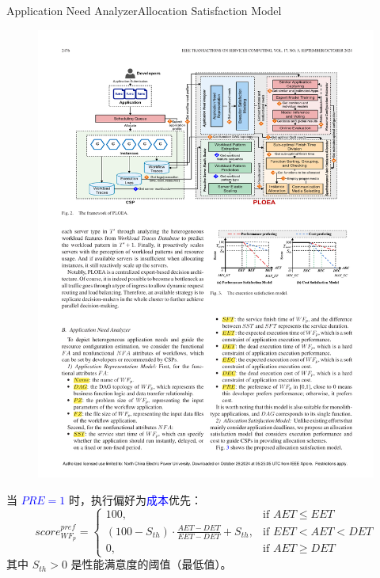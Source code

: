 \documentclass[aspectratio=169]{beamer}
\begin{document}
\begin{frame}{Application Need Analyzer}{Allocation Satisfaction Model}
  \begin{figure}
    \centering
    \includegraphics[height=0.4\textheight]{img/method/satisfaction-model.pdf}
  \end{figure}
  当 \textcolor{blue}{$PRE=1$} 时，执行偏好为\textcolor{blue}{成本}优先：
  \begin{equation*}
    score_{WF_p}^{pref} =
    \begin{cases}
      100, & \text{if } AET \leqslant EET \\
      (100-S_{th}) \cdot \frac{AET - DET}{EET - DET} + S_{th}, & \text{if } EET < AET < DET \\
      0, & \text{if } AET \geqslant DET
    \end{cases}
  \end{equation*}
  其中 $S_{th}>0$ 是性能满意度的阈值（最低值）。
\end{frame}
\end{document}
